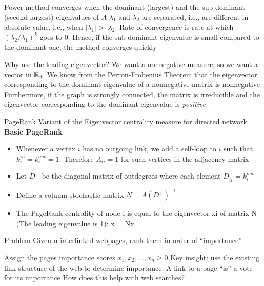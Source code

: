\documentclass[aspectratio=169]{beamer}\usepackage[]{graphicx}\usepackage[]{xcolor}
\begin{document}
\begin{frame}
Power method converges when the dominant (largest) and the sub-dominant (second largest) eigenvalues of $A$ $\lambda_1$ and $\lambda_2$ are separated, i.e., are different in absolute value, i.e., when $|\lambda_1| > |\lambda_2|$
\vfill
Rate of convergence is rate at which $(\lambda_2 / \lambda_1)^k$ goes to $0$. Hence, if the sub-dominant eigenvalue is small compared to the dominant one, the method converges quickly
\end{frame}


\begin{frame}{Why use the leading eigenvector?}
	We want a nonnegative measure, so we want a vector in $\mathbb{R}_+$
	\vfill
	We know from the Perron-Frobenius Theorem that the eigenvector corresponding to the dominant eigenvalue of a nonnegative matrix is nonnegative
	\vfill
	Furthermore, if the graph is strongly connected, the matrix is irreducible and the eigenvector corresponding to the dominant eigenvalue is \emph{positive}
\end{frame}




\begin{frame}{PageRank}
Variant of the Eigenvector centrality measure for directed network
\vfill
\textbf{Basic PageRank}
\begin{itemize}
\item Whenever a vertex $i$ has no outgoing link, we add a self-loop to $i$ such that $k^{in}_i=k^{out}_i=1$. Therefore $A_{ii}=1$ for such vertices in the adjacency matrix
\item Let $D^+$ be the diagonal matrix of outdegrees where each element $D_{ii}^+ = k_i^{out}$
\item Define a column stochastic matrix $N = A(D^+)^{-1}$
\item
The PageRank centrality of node i is equal to the 
eigenvector xi of matrix N (The leading eigenvalue is 1):
x = Nx
\end{itemize}
\end{frame}


\begin{frame}
	\begin{block}{Problem}
		Given n interlinked webpages, rank them in order of ``importance''
	\end{block}
	\vfill
Assign the pages importance scores $x_1, x_2,\ldots, x_n\geq 0$
\vfill
Key insight: use the existing link structure of the web to determine importance. A link to a page ``is'' a vote for its importance
\vfill
How does this help with web searches?
\end{frame}
\end{document}
